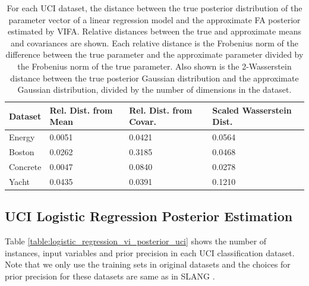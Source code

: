 \documentclass[10pt]{article} %
\begin{document}
\begin{table}[!h]
\caption{For each UCI dataset, the distance between the true posterior distribution
of the parameter vector of a linear regression model and the approximate FA posterior
estimated by VIFA. Relative distances between the true and approximate means and
covariances are shown. Each relative distance is the Frobenius norm of the difference
between the true parameter and the approximate parameter divided by the Frobenius
norm of the true parameter. Also shown is the 2-Wasserstein distance between the true
posterior Gaussian distribution and the approximate Gaussian distribution, divided by
the number of dimensions in the dataset.}
\label{table:linear_regression_vi_posterior_uci}
\begin{center}
\begin{tabular}{l|lll}
\textbf{Dataset} & \textbf{Rel. Dist. from Mean} & \textbf{Rel. Dist. from Covar.} & \textbf{Scaled Wasserstein Dist.} \\ \hline
Energy           & 0.0051                        & 0.0421                          & 0.0564                            \\
Boston           & 0.0262                        & 0.3185                          & 0.0468                            \\
Concrete         & 0.0047                        & 0.0840                          & 0.0278                            \\
Yacht            & 0.0435                        & 0.0391                          & 0.1210                           
\end{tabular}
\end{center}
\end{table}

\subsection{UCI Logistic Regression Posterior Estimation}
\label{app:uci_logistic_posterior}
Table \ref{table:logistic_regression_vi_posterior_uci} shows the number of instances, input variables and prior precision in each UCI classification dataset. Note that we only use the training sets in original datasets and the choices for prior precision for these datasets are same as in SLANG \cite{mishkin2018}.
\end{document}
